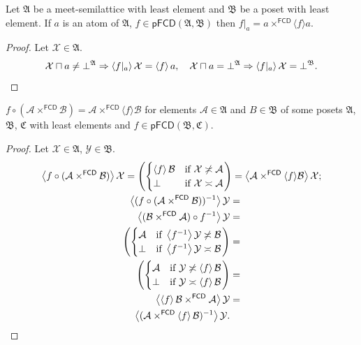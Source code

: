 \begin{prop}
Let $\mathfrak{A}$ be a meet-semilattice with least element and $\mathfrak{B}$
be a poset with least element. If $a$ is an atom of $\mathfrak{A}$,
$f\in\mathsf{pFCD}(\mathfrak{A},\mathfrak{B})$ then $f|_{a}=a\times^{\mathsf{FCD}}\langle f\rangle a$.\end{prop}
\begin{proof}
Let $\mathcal{X}\in\mathfrak{A}$. 
\[
\mathcal{X}\sqcap a\neq\bot^{\mathfrak{A}}\Rightarrow\left\langle f|_{a}\right\rangle\mathcal{X}=\left\langle f\right\rangle a,\hspace{1em}\mathcal{X}\sqcap a=\bot^{\mathfrak{A}}\Rightarrow\left\langle f|_{a}\right\rangle\mathcal{X}=\bot^{\mathfrak{B}}.
\]
\end{proof}
\begin{prop}
$f\circ(\mathcal{A}\times^{\mathsf{FCD}}\mathcal{B})=\mathcal{A}\times^{\mathsf{FCD}}\langle f\rangle\mathcal{B}$
for elements $\mathcal{A}\in\mathfrak{A}$ and $B\in\mathfrak{B}$
of some posets $\mathfrak{A}$, $\mathfrak{B}$, $\mathfrak{C}$ with
least elements and $f\in\mathsf{pFCD}(\mathfrak{B},\mathfrak{C})$.\end{prop}
\begin{proof}
Let $\mathcal{X}\in\mathfrak{A}$, $\mathcal{Y}\in\mathfrak{B}$.
\begin{gather*}
\left\langle f\circ(\mathcal{A}\times^{\mathsf{FCD}}\mathcal{B})\right\rangle\mathcal{X}=\left(\begin{cases}
\left\langle f\right\rangle\mathcal{B} & \text{if }\mathcal{X}\not\asymp\mathcal{A}\\
\bot & \text{if }\mathcal{X}\asymp\mathcal{A}
\end{cases}\right)=\left\langle \mathcal{A}\times^{\mathsf{FCD}}\langle f\rangle\mathcal{B}\right\rangle\mathcal{X};\\
\begin{aligned}\left\langle (f\circ(\mathcal{A}\times^{\mathsf{FCD}}\mathcal{B}))^{-1}\right\rangle\mathcal{Y} & =\\
\left\langle (\mathcal{B}\times^{\mathsf{FCD}}\mathcal{A})\circ f^{-1}\right\rangle\mathcal{Y} & =\\
\left(\begin{cases}
\mathcal{A} & \text{if }\left\langle f^{-1}\right\rangle\mathcal{Y}\not\asymp\mathcal{B}\\
\bot & \text{if }\left\langle f^{-1}\right\rangle\mathcal{Y}\asymp\mathcal{B}
\end{cases}\right) & =\\
\left(\begin{cases}
\mathcal{A} & \text{if }\mathcal{Y}\not\asymp\left\langle f\right\rangle\mathcal{B}\\
\bot & \text{if }\mathcal{Y}\asymp\left\langle f\right\rangle\mathcal{B}
\end{cases}\right) & =\\
\left\langle \left\langle f\right\rangle\mathcal{B}\times^{\mathsf{FCD}}\mathcal{A}\right\rangle\mathcal{Y} & =\\
\left\langle (\mathcal{A}\times^{\mathsf{FCD}}\left\langle f\right\rangle\mathcal{B})^{-1}\right\rangle\mathcal{Y}.
\end{aligned}
\end{gather*}

\end{proof}

